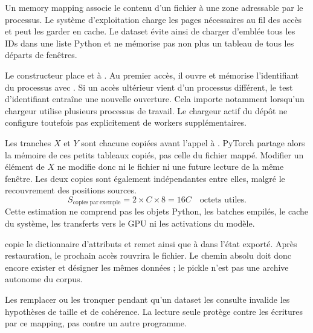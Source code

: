 Un memory mapping associe le contenu d'un fichier à une zone adressable
par le processus. Le système d'exploitation charge les pages nécessaires
au fil des accès et peut les garder en cache. Le dataset évite ainsi
de charger d'emblée tous les IDs dans une liste Python et ne mémorise
pas non plus un tableau de tous les départs de fenêtres.

Le constructeur place  et  à .
Au premier accès, il ouvre  et mémorise
l'identifiant du processus avec .
Si un accès ultérieur vient d'un processus différent, le test d'identifiant
entraîne une nouvelle ouverture. Cela importe notamment lorsqu'un chargeur
utilise plusieurs processus de travail.
Le chargeur actif du dépôt ne configure toutefois pas explicitement de workers
supplémentaires.

Les tranches \(X\) et \(Y\) sont chacune copiées avant l'appel à
. PyTorch partage alors la mémoire de ces petits
tableaux copiés, pas celle du fichier mappé. Modifier un élément de \(X\)
ne modifie donc ni le fichier ni une future lecture de la même fenêtre.
Les deux copies sont également indépendantes entre elles, malgré
le recouvrement des positions sources.
\[
    S_{\mathrm{copies\ par\ exemple}}=2\times C\times8=16C
    \quad\text{octets utiles.}
\]
Cette estimation ne comprend pas les objets Python, les batches empilés,
le cache du système, les transferts vers le GPU ni les activations du modèle.

 copie le dictionnaire d'attributs et remet
 ainsi que  à  dans l'état exporté.
Après restauration, le prochain accès rouvrira le fichier.
Le chemin absolu doit donc encore exister et désigner les mêmes données ;
le pickle n'est pas une archive autonome du corpus.

Les remplacer ou les tronquer pendant qu'un dataset les consulte invalide
les hypothèses de taille et de cohérence. La lecture seule protège contre
les écritures par ce mapping, pas contre un autre programme.

